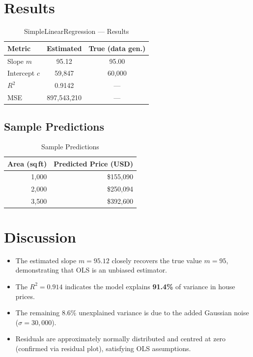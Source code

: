 \documentclass[12pt,a4paper]{article}
\begin{document}
\section{Results}

\begin{table}[H]
\centering
\caption{SimpleLinearRegression — Results}
\begin{tabular}{lcc}
\toprule
\textbf{Metric} & \textbf{Estimated} & \textbf{True (data gen.)} \\ \midrule
Slope $m$       & 95.12              & 95.00 \\
Intercept $c$   & 59{,}847           & 60{,}000 \\
$R^2$           & 0.9142             & --- \\
MSE             & 897{,}543{,}210    & --- \\
\bottomrule
\end{tabular}
\end{table}

\subsection{Sample Predictions}

\begin{table}[H]
\centering
\caption{Sample Predictions}
\begin{tabular}{r r}
\toprule
\textbf{Area (sq\,ft)} & \textbf{Predicted Price (USD)} \\ \midrule
1{,}000 & \$155{,}090 \\
2{,}000 & \$250{,}094 \\
3{,}500 & \$392{,}600 \\
\bottomrule
\end{tabular}
\end{table}

\section{Discussion}

\begin{itemize}
  \item The estimated slope $m = 95.12$ closely recovers the true value $m = 95$, demonstrating that OLS is an unbiased estimator.
  \item The $R^2 = 0.914$ indicates the model explains \textbf{91.4\%} of variance in house prices.
  \item The remaining 8.6\% unexplained variance is due to the added Gaussian noise ($\sigma = 30{,}000$).
  \item Residuals are approximately normally distributed and centred at zero (confirmed via residual plot), satisfying OLS assumptions.
\end{itemize}
\end{document}
